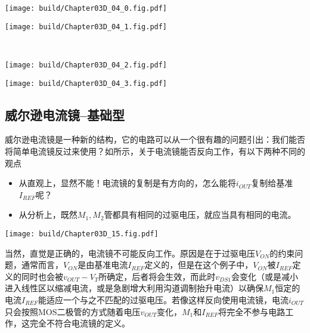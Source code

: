 \begin{Figure}
    \begin{FigureSub}
        \texttt{[image: build/Chapter03D\_04\_0.fig.pdf]}
    \end{FigureSub}
    \begin{FigureSub}
        \texttt{[image: build/Chapter03D\_04\_1.fig.pdf]}
    \end{FigureSub}\\ \vspace{0.25cm}
    \begin{FigureSub}
        \texttt{[image: build/Chapter03D\_04\_2.fig.pdf]}
    \end{FigureSub}
    \begin{FigureSub}
        \texttt{[image: build/Chapter03D\_04\_3.fig.pdf]}
    \end{FigureSub}
\end{Figure}

\subsection{威尔逊电流镜--基础型}
威尔逊电流镜是一种新的结构，它的电路可以从一个很有趣的问题引出：我们能否将简单电流镜反过来使用？如所示，关于电流镜能否反向工作，有以下两种不同的观点
\begin{itemize}
    \item 从直观上，显然不能！电流镜的复制是有方向的，怎么能将$i_{OUT}$复制给基准$I_{REF}$呢？
    \item 从分析上，既然$M_1,M_2$管都具有相同的过驱电压，就应当具有相同的电流。
\end{itemize}

\begin{Figure}[简单电流镜能否逆向使用？]
    \texttt{[image: build/Chapter03D\_15.fig.pdf]}
\end{Figure}

当然，直觉是正确的，电流镜不可能反向工作。原因是在于过驱电压$V_{ON}$的约束问题，通常而言，$V_{ON}$是由基准电流$I_{REF}$定义的，但是在这个例子中，$V_{ON}$被$I_{REF}$定义的同时也会被$v_{OUT}-V_T$所确定，后者将会生效，而此时$v_{DS1}$会变化（或是减小进入线性区以缩减电流，或是急剧增大利用沟道调制抬升电流）以确保$M_1$恒定的电流$I_{REF}$能适应一个与之不匹配的过驱电压。若像这样反向使用电流镜，电流$i_{OUT}$只会按照MOS二极管的方式随着电压$v_{OUT}$变化，$M_1$和$I_{REF}$将完全不参与电路工作，这完全不符合电流镜的定义。

